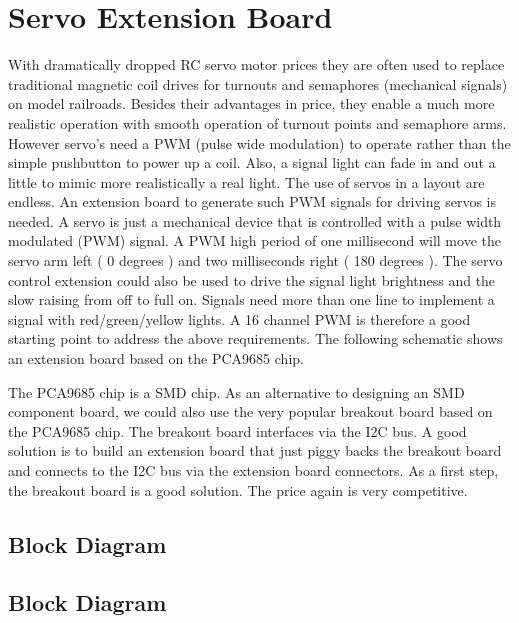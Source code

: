 \chapter{Servo Extension Board}

With dramatically dropped RC servo motor prices they are often used to replace traditional magnetic coil drives for turnouts and semaphores (mechanical signals) on model railroads. Besides their advantages in price, they enable a much more realistic operation with smooth operation of turnout points and semaphore arms. However servo’s need a PWM (pulse wide modulation) to operate rather than the simple pushbutton to power up a coil. Also, a signal light can fade in and out a little to mimic more realistically a real light. The use of servos in a layout are endless. An extension board to generate such PWM signals for driving servos is needed. A servo is just a mechanical device that is controlled with a pulse width modulated (PWM) signal. A PWM high period of one millisecond will move the servo arm left ( 0 degrees ) and two milliseconds right ( 180 degrees ). The servo control extension could also be used to drive the signal light brightness and the slow raising from off to full on. Signals need more than one line to implement a signal with red/green/yellow lights. A 16 channel PWM is therefore a good starting point to address the above requirements. The following schematic shows an extension board based on the PCA9685 chip.

The PCA9685 chip is a SMD chip. As an alternative to designing an SMD component board, we could also use the very popular breakout board based on the PCA9685 chip. The breakout board interfaces via the I2C bus. A good solution is to build an extension board that just piggy backs the breakout board and connects to the I2C bus via the extension board connectors. As a first step, the breakout board is a good solution. The price again is very competitive.

\section{Block Diagram}

\section{Block Diagram}


